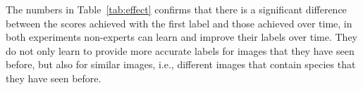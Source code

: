 %
The numbers in Table~\ref{tab:effect} confirms that there is a significant difference 
between the scores achieved with the first label and those achieved over time, in both 
experiments non-experts can learn and improve their labels over time. 
They do not only learn to provide more accurate labels for images that they have seen 
before, but also for similar images, i.e., different images that contain species that they have seen before. 


\fi






